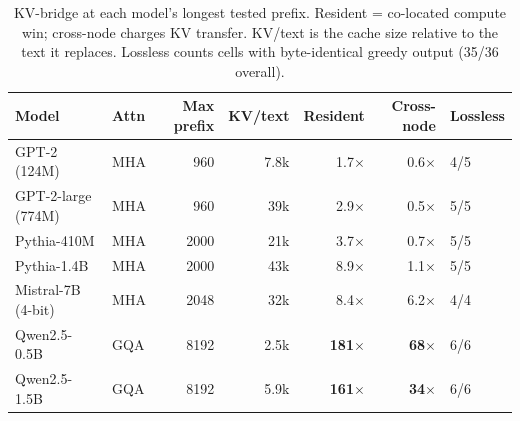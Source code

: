 \documentclass[11pt]{article}
\begin{document}
\begin{table}[t]\centering\footnotesize
\begin{tabular}{llrrrrl}
\toprule
Model & Attn & Max prefix & KV/text & Resident & Cross-node & Lossless \\
\midrule
GPT-2 (124M)      & MHA & 960  & 7.8k  & 1.7$\times$   & 0.6$\times$  & 4/5 \\
GPT-2-large (774M)& MHA & 960  & 39k   & 2.9$\times$   & 0.5$\times$  & 5/5 \\
Pythia-410M       & MHA & 2000 & 21k   & 3.7$\times$   & 0.7$\times$  & 5/5 \\
Pythia-1.4B       & MHA & 2000 & 43k   & 8.9$\times$   & 1.1$\times$  & 5/5 \\
Mistral-7B (4-bit)& MHA & 2048 & 32k   & 8.4$\times$   & 6.2$\times$  & 4/4 \\
Qwen2.5-0.5B      & GQA & 8192 & 2.5k  & \textbf{181$\times$} & \textbf{68$\times$} & 6/6 \\
Qwen2.5-1.5B      & GQA & 8192 & 5.9k  & \textbf{161$\times$} & \textbf{34$\times$} & 6/6 \\
\bottomrule
\end{tabular}
\caption{KV-bridge at each model's longest tested prefix. Resident = co-located compute win; cross-node
charges KV transfer. KV/text is the cache size relative to the text it replaces. Lossless counts cells
with byte-identical greedy output (35/36 overall).}
\label{tab:kv}
\end{table}
\end{document}

